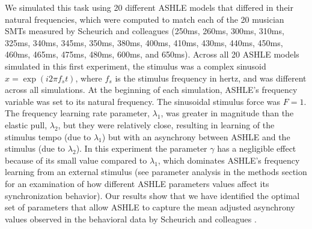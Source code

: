 \documentclass[10pt,letterpaper]{article}
\begin{document}
We simulated this task using 20 different ASHLE models that differed in their natural frequencies, which were computed to match each of the 20 musician SMTs measured by Scheurich and colleagues \cite{scheurich2018tapping} (250ms, 260ms, 300ms, 310ms, 325ms, 340ms, 345ms, 350ms, 380ms, 400ms, 410ms, 430ms, 440ms, 450ms, 460ms, 465ms, 475ms, 480ms, 600ms, and 650ms). Across all 20 ASHLE models simulated in this first experiment, the stimulus was a complex sinusoid $x=\exp(i2\pi f_s t)$, where $f_s$ is the stimulus frequency in hertz, and was different across all simulations. At the beginning of each simulation, ASHLE's frequency variable was set to its natural frequency. The sinusoidal stimulus force was $F=1$. The frequency learning rate parameter, $\lambda_1$, was greater in magnitude than the elastic pull, $\lambda_2$, but they were relatively close, resulting in learning of the stimulus tempo (due to $\lambda_1$) but with an asynchrony between ASHLE and the stimulus (due to $\lambda_2$). In this experiment the parameter $\gamma$ has a negligible effect because of its small value compared to $\lambda_1$, which dominates ASHLE's frequency learning from an external stimulus (see parameter analysis in the methods section for an examination of how different ASHLE parameters values affect its synchronization behavior). Our results show that we have identified the optimal set of parameters that allow ASHLE to capture the mean adjusted asynchrony values observed in the behavioral data by Scheurich and colleagues \cite{scheurich2018tapping}.
\end{document}
